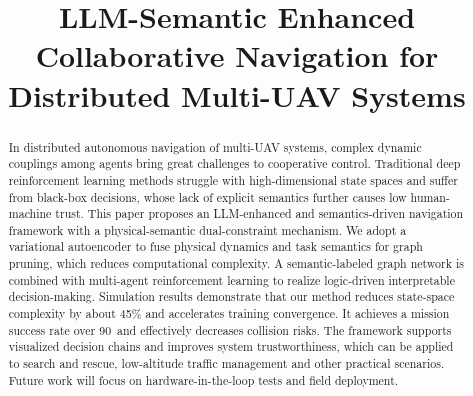 \documentclass[conference]{IEEEtran}
\begin{document}
\title{LLM-Semantic Enhanced Collaborative Navigation for Distributed Multi-UAV Systems
}


\maketitle

\begin{abstract}
In distributed autonomous navigation of multi-UAV systems, complex dynamic couplings among agents bring great challenges to cooperative control. Traditional deep reinforcement learning methods struggle with high-dimensional state spaces and suffer from black-box decisions, whose lack of explicit semantics further causes low human-machine trust. This paper proposes an LLM-enhanced and semantics-driven navigation framework with a physical-semantic dual-constraint mechanism. We adopt a variational autoencoder to fuse physical dynamics and task semantics for graph pruning, which reduces computational complexity. A semantic-labeled graph network is combined with multi-agent reinforcement learning to realize logic-driven interpretable decision-making. Simulation results demonstrate that our method reduces state-space complexity by about 45\% and accelerates training convergence. It achieves a mission success rate over 90\ and effectively decreases collision risks. The framework supports visualized decision chains and improves system trustworthiness, which can be applied to search and rescue, low-altitude traffic management and other practical scenarios. Future work will focus on hardware-in-the-loop tests and field deployment.

\end{abstract}
\end{document}
